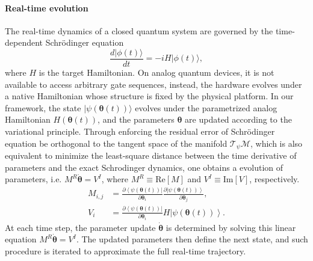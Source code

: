 \documentclass[twocolumn,
pra,aps,superscriptaddress,showpacs,amsmath,amssymb]{revtex4-2}
\begin{document}
\paragraph{Real-time evolution} 
The real-time dynamics of a closed quantum system are governed by the time-dependent Schrödinger equation
\begin{equation}
\frac{d|\phi(t)\rangle}{dt} = -i H |\phi(t)\rangle,
\end{equation}
where $H$ is the target Hamiltonian. On analog quantum devices, it is not available to access arbitrary gate sequences, instead, the hardware evolves under a native Hamiltonian whose structure is fixed by the physical platform.
In our framework, the state $|\psi(\bm{\theta}(t))\rangle$ evolves under the parametrized analog Hamiltonian $H(\bm{\theta}(t))$, and the parameters $\bm{\theta}$ are updated according to the variational principle. Through enforcing the residual error of Schrödinger equation be orthogonal to the tangent space of the manifold $\mathcal{T}_\psi \mathcal{M}$, which is also equivalent to minimize the least-square distance between the time derivative of parameters and the exact Schrodinger dynamics, one obtains a evolution of parameters, i.e. $M^R\dot{\bm{\theta}}=V^I$, where $M^R \equiv \mathrm{Re}[M]$ and $V^I \equiv \mathrm{Im}[V]$, respectively.
\begin{align}
M_{i,j}& = \frac{\partial\left<\psi(\bm{\theta}(t))\right|}{\partial\bm{\theta}_i}\frac{\partial\left|\psi(\bm{\theta}(t))\right>}{\partial\bm{\theta}_j},\\
V_i &= \frac{\partial\left\langle\psi(\bm{\theta}(t))\right|}{\partial\bm{\theta}_{i}}H\left|\psi(\bm{\theta}(t))\right\rangle.
\end{align}
At each time step, the parameter update $\dot{\bm{\theta}}$ is determined by solving this linear equation $M^R \dot{\bm{\theta}} = V^I$. The updated parameters then define the next state, and such procedure is iterated to approximate the full real-time trajectory.
\end{document}
